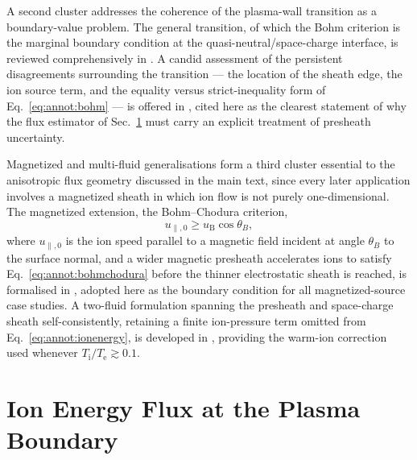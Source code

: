 A second cluster addresses the coherence of the plasma-wall transition as a boundary-value problem. The general transition, of which the Bohm criterion is the marginal boundary condition at the quasi-neutral/space-charge interface, is reviewed comprehensively in \cite{ref0013}. A candid assessment of the persistent disagreements surrounding the transition --- the location of the sheath edge, the ion source term, and the equality versus strict-inequality form of Eq.~\eqref{eq:annot:bohm} --- is offered in \cite{ref0015}, cited here as the clearest statement of why the flux estimator of Sec.~\ref{app:annot:ion-energy-flux} must carry an explicit treatment of presheath uncertainty.

Magnetized and multi-fluid generalisations form a third cluster essential to the anisotropic flux geometry discussed in the main text, since every later application involves a magnetized sheath in which ion flow is not purely one-dimensional. The magnetized extension, the Bohm--Chodura criterion,
\begin{equation}
u_{\parallel,0} \ge u_{\mathrm{B}}\cos\theta_{B},
\label{eq:annot:bohmchodura}
\end{equation}
where $u_{\parallel,0}$ is the ion speed parallel to a magnetic field incident at angle $\theta_{B}$ to the surface normal, and a wider magnetic presheath accelerates ions to satisfy Eq.~\eqref{eq:annot:bohmchodura} before the thinner electrostatic sheath is reached, is formalised in \cite{ref0017}, adopted here as the boundary condition for all magnetized-source case studies. A two-fluid formulation spanning the presheath and space-charge sheath self-consistently, retaining a finite ion-pressure term omitted from Eq.~\eqref{eq:annot:ionenergy}, is developed in \cite{ref0023}, providing the warm-ion correction used whenever $T_{\mathrm{i}}/T_{\mathrm{e}} \gtrsim 0.1$.

\section{Ion Energy Flux at the Plasma Boundary}
\label{app:annot:ion-energy-flux}

